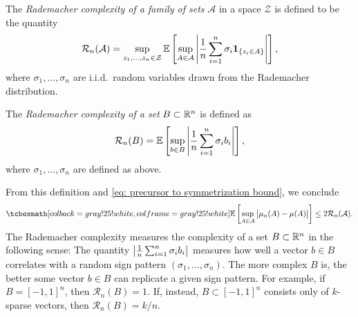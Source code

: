 \begin{definition}
The \emph{Rademacher complexity of a family of sets} $\mathcal{A}$ in a space $\mathcal{Z}$ is defined to be the quantity
\[
    \mathcal{R}_n(\mathcal{A}) = \sup_{z_1, \dots, z_n \in \mathcal{Z}} \mathbb{E}\left[\sup_{A \in \mathcal{A}} \abs{ \frac{1}{n} \sum_{i=1}^n \sigma_i \mathbf{1}_{\left\{z_i \in A\right\}}}\right],
\]
where $\sigma_1, \dots, \sigma_n$ are i.i.d.\ random variables drawn from the Rademacher distribution.

The \emph{Rademacher complexity of a set} $B \subset \mathbb{R}^n$ is defined as 
\[
    \mathcal{R}_n(B) = \mathbb{E}\left[\sup_{b \in B} \abs{ \frac{1}{n} \sum_{i=1}^n \sigma_i b_i}\right],
\]
where $\sigma_1, \dots, \sigma_n$ are defined as above.
\end{definition}
From this definition and \eqref{eq: precursor to symmetrization bound}, we conclude
\begin{equation}
\label{eq: symmetrization bound}
    \highlightMath{
        \Ex{\sup_{A \in \mathcal{A}} \bigAbs{ \mu_n(A) - \mu(A) }} \leq 2 \mathcal{R}_n(\mathcal{A}).
    }
\end{equation}
The Rademacher complexity measures the complexity of a set $B \subset \mathbb{R}^n$ in the following sense: The quantity $\abs{ \frac{1}{n} \sum_{i=1}^n \sigma_i b_i}$ measures how well a vector $b \in B$ correlates with a random sign pattern $(\sigma_1, \dots, \sigma_n)$. The more complex $B$ is, the better some vector $b \in B$ can replicate a given sign pattern. For example, if $B = [-1, 1]^n$, then $\mathcal{R}_n(B) = 1$. If, instead, $B \subset [-1, 1]^n$ consists only of $k$-sparse vectors, then $\mathcal{R}_n(B) = k/n$.
